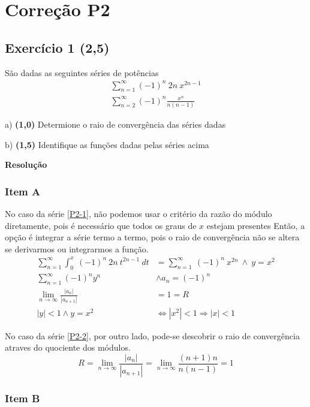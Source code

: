 \documentclass[12pt,openany, letterpaper]{book}
\newcommand{\LI}[1][n]{\lim_{{#1} \rightarrow \infty}}
\newcommand{\soma}[2][n]{\sum_{{#1} = #2}^\infty}
\newcommand{\E}[1]{Exercício #1}
\newcommand{\Resolve}{\begin{center} \textbf{Resolução} \end{center}}
\begin{document}
{{\begin{multicols}{2}
\end{multicols}

\chapter{Correção P2}
\label{C:P2}

\section*{\E{1} (2,5)}{São dadas as seguintes séries de potências \begin{align}
    \soma{1} (-1)^n \ 2n\  x^{2n-1} \label{P2-1} \\
    \soma{2} (-1)^n \frac{x^n}{n(n-1)} \label{P2-2}
\end{align}}

a) \textbf{(1,0)} Determione o raio de convergência das séries dadas

b) \textbf{(1,5)} Identifique as funções dadas pelas séries acima

\Resolve

\subsection*{Item A}

\hspace{5mm}No caso da série \ref{P2-1}, não podemos usar o critério da razão do módulo diretamente, pois é necessário que todos os graus de $x$ estejam presentes Então, a opção é integrar a série termo a termo, pois o raio de convergência não se altera se derivarmos ou integrarmos a função. \begin{align*}
    \soma{1} \int_0^x \ (-1)^n \ 2n \ t^{2n-1} \ dt &= \soma{1} \ (-1)^n \ x^{2n} \ \land \ y = x^2 \\
    \soma{1} (-1)^n y^n \ &\land a_n = (-1)^n\\
    \LI \frac{|a_n|}{|a_{n+1}|} &= 1 = R \\
    |y| < 1 \land y = x^2 &\Longleftrightarrow |x^2| < 1 \Rightarrow |x| < 1
\end{align*}

No caso da série \ref{P2-2}, por outro lado, pode-se descobrir o raio de convergência atraves do quociente dos módulos. $$R = \LI \frac{|a_n|}{|a_{n+1}|} = \LI \frac{(n+1)n}{n(n-1)} = 1$$

\subsection*{Item B}

}}
\end{document}
